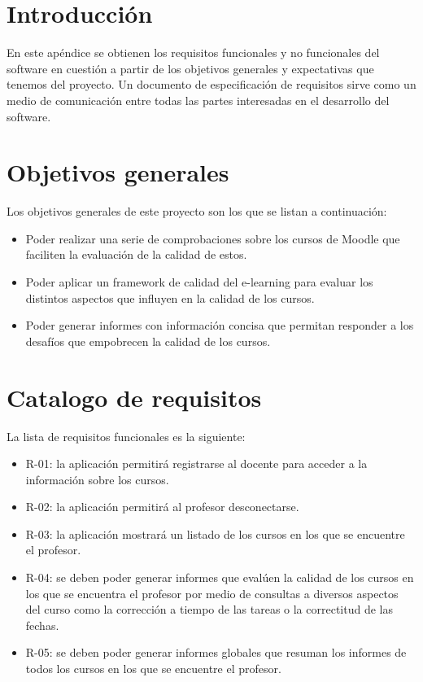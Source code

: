 \label{apendice:B}
\section{Introducción}
En este apéndice se obtienen los requisitos funcionales y no funcionales del software en cuestión a partir de los objetivos generales y expectativas que tenemos del proyecto. Un documento de especificación de requisitos sirve como un medio de comunicación entre todas las partes interesadas en el desarrollo del software.
\section{Objetivos generales}
	Los objetivos generales de este proyecto son los que se listan a continuación:
\begin{itemize}
	\item
	Poder realizar una serie de comprobaciones sobre los cursos de Moodle que faciliten la evaluación de la calidad de estos.
	\item
	Poder aplicar un framework de calidad del e-learning para evaluar los distintos aspectos que influyen en la calidad de los cursos.
	\item
	Poder generar informes con información concisa que permitan responder a los desafíos que empobrecen la calidad de los cursos.
\end{itemize}

\section{Catalogo de requisitos}
La lista de requisitos funcionales es la siguiente:
\begin{itemize}
	\item R-01: la aplicación permitirá registrarse al docente para acceder a la información sobre los cursos.
	\item R-02: la aplicación permitirá al profesor desconectarse.
	\item R-03: la aplicación mostrará un listado de los cursos en los que se encuentre el profesor.
	\item R-04: se deben poder generar informes que evalúen la calidad de los cursos en los que se encuentra el profesor por medio de consultas a diversos aspectos del curso como la corrección a tiempo de las tareas o la correctitud de las fechas.
	\item R-05: se deben poder generar informes globales que resuman los informes de todos los cursos en los que se encuentre el profesor.
\end{itemize}

